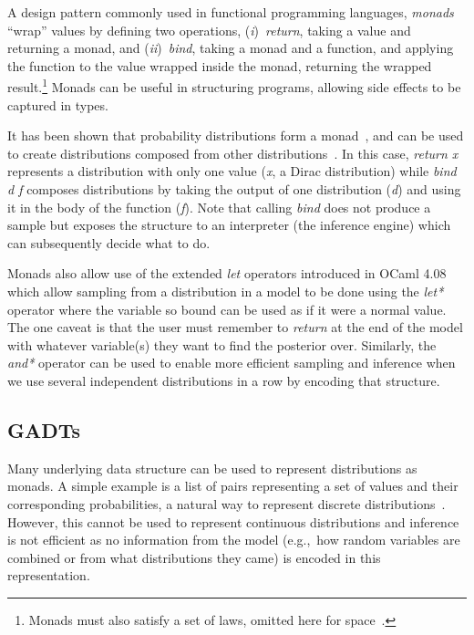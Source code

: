 \documentclass[sigconf]{acmart}
\newcommand{\one}{({\em i})\/}
\newcommand{\two}{({\em ii})\/}
\begin{document}
A design pattern commonly used in functional programming languages, \emph{monads} ``wrap'' values by defining two operations, \one~\emph{return}, taking a value and returning a monad, and \two~\emph{bind}, taking a monad and a function, and applying the function to the value wrapped inside the monad, returning the wrapped result.\footnote{Monads must also satisfy a set of laws, omitted here for space~\cite{wadler1990comprehending}.} Monads can be useful in structuring programs, allowing side effects to be captured in types.

It has been shown that probability distributions form a monad~\cite{giry1982categorical, jones1989probabilistic}, and can be used to create distributions composed from other distributions~\cite{ramsey2002stochastic}. In this case, \emph{return x} represents a distribution with only one value (\emph{x}, a Dirac distribution) while \emph{bind d f} composes distributions by taking the output of one distribution (\emph{d}) and using it in the body of the function (\emph{f}). Note that calling \emph{bind} does not produce a sample but exposes the structure to an interpreter (the inference engine) which can subsequently decide what to do.

Monads also allow use of the extended \emph{let} operators introduced in OCaml 4.08 which allow sampling from a distribution in a model to be done using the \emph{let*} operator where the variable so bound can be used as if it were a normal value. The one caveat is that the user must remember to \emph{return} at the end of the model with whatever variable(s) they want to find the posterior over. Similarly, the \emph{and*} operator can be used to enable more efficient sampling and inference when we use several independent distributions in a row by encoding that structure.

\subsection{GADTs}

Many underlying data structure can be used to represent distributions as monads. A simple example is a list of pairs representing a set of values and their corresponding probabilities, a natural way to represent discrete distributions~\cite{erwig}. However, this cannot be used to represent continuous distributions and inference is not efficient as no information from the model (e.g.,~how random variables are combined or from what distributions they came) is encoded in this representation.
\end{document}
